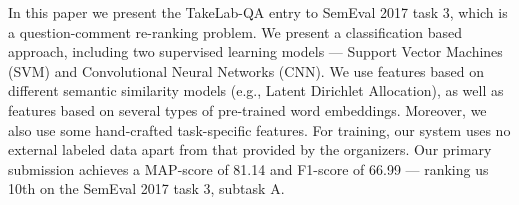 In this paper we present the TakeLab-QA entry to SemEval 2017 task 3, which is a question-comment re-ranking problem. We present a classification based approach, including two supervised learning models --- Support Vector Machines (SVM) and Convolutional Neural Networks (CNN). We use features based on different semantic similarity models (e.g., Latent Dirichlet Allocation), as well as features based on several types of pre-trained word embeddings. Moreover, we also use some hand-crafted task-specific features. For training, our system uses no external labeled data apart from that provided by the organizers. Our primary submission achieves a MAP-score of 81.14 and F1-score of 66.99 --- ranking us 10th on the SemEval 2017 task 3, subtask A.
